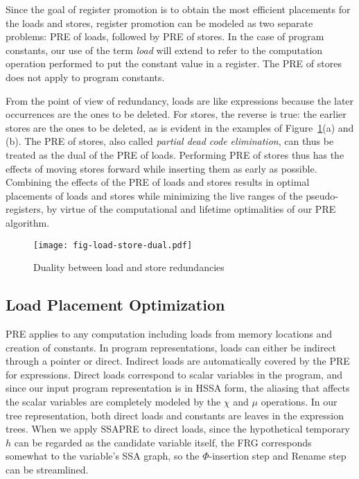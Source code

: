 Since the goal of
register promotion is to obtain the most efficient placements for the loads and
stores, register promotion can be modeled as two separate problems: PRE of 
loads, followed by PRE of stores.  In the case of program constants, our use of
the term \emph{load} will extend to refer to the computation operation performed
to put the constant value in a register.  The PRE of stores does not apply
to program constants.

From the point of view of redundancy, loads are like expressions because the
later occurrences are the ones to be deleted.  For stores, the reverse is true:
the earlier stores are the ones to be deleted, as is evident in the examples
of Figure~\ref{fig:load-store-dual}(a) and (b).  The PRE of stores,
also called \emph{partial dead code elimination}, can thus be treated as the
dual of the PRE of loads.  Performing PRE of stores thus has the effects
of moving stores forward while inserting them as early as possible.  
Combining the effects of the PRE of loads and stores results in optimal
placements of loads and stores while minimizing the live ranges of the
pseudo-registers, by virtue of the computational and lifetime optimalities
of our PRE algorithm.

\begin{figure}
\centering
\texttt{[image: fig-load-store-dual.pdf]}
\caption{Duality between load and store redundancies}
\label{fig:load-store-dual}
\end{figure}

\subsection{Load Placement Optimization}

PRE applies to any computation including loads from memory locations and
creation of constants.  In program representations, loads can either be indirect
through a pointer or direct.  Indirect loads are automatically covered by
the PRE for expressions.  Direct loads correspond to scalar variables in the
program, and since our input program representation is in HSSA form, the 
aliasing that affects the scalar variables are completely modeled by the
$\chi$ and $\mu$ operations.  In our tree representation, both
direct loads  and constants are leaves in the expression trees.  
When we apply SSAPRE to direct loads, since the hypothetical temporary $h$ can
be regarded as the candidate variable itself, the FRG corresponds somewhat to
the variable's SSA graph, so the $\Phi$-insertion step and
Rename step can be streamlined. 

